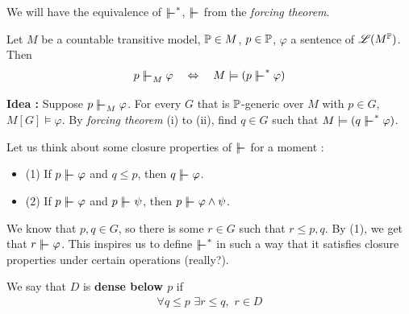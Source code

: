\documentclass[12pt,a4paper]{article}
\renewenvironment{i}
{\begin{itemize} 
	}%
	{\end{itemize}
}
\begin{document}
We will have the equivalence of $\forces^*$, $\forces$ from the \emph{forcing theorem}.
\s

\prop Let $M$ be a countable transitive model, $\mathbb{P} \in M$, $p\in \mathbb{P}$, $\varphi$ a sentence of $\mathscr{L}(M^{\mathbb{P}})$. Then
\begin{align*}
p\forces_M \varphi \quad \Leftrightarrow \quad M \models (p\forces^* \varphi)
\end{align*}
\s

\textbf{Idea :} Suppose $p\forces_M \varphi$. For every $G$ that is $\mathbb{P}$-generic over $M$ with $p\in G$, $M[G] \models \varphi$. By \emph{forcing theorem} (i) to (ii), find $q\in G$ such that  $M\models (q\forces^* \varphi)$.

\quad Let us think about some closure properties of $\forces$ for a moment :
\begin{i}
\item[(1)] If $p\forces \varphi$ and $q\leq p$, then $q\forces \varphi$.
\item[(2)] If $p\forces \varphi$ and $p\forces \psi$, then $p\forces \varphi \wedge \psi$. 
\end{i}
We know that $p, q\in G$, so there is some $r\in G$ such that $r\leq p, q$. By (1), we get that $r\forces \varphi$. This inspires us to define $\forces^*$ in such a way that it satisfies closure properties under certain operations (really?).
\s

 We say that $D$ is \textbf{dense below $p$} if
\begin{align*}
\forall q\leq p \,\, \exists r\leq q, \,\, r\in D
\end{align*}
\s
\end{document}
